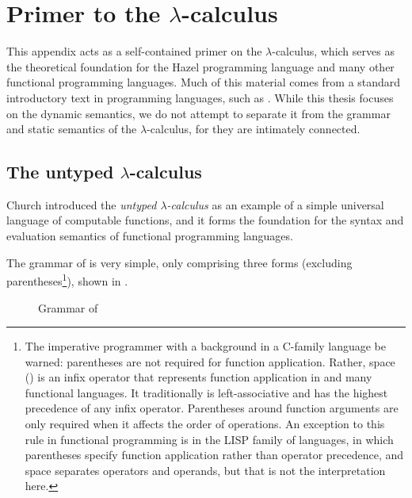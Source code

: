 \chapter{Primer to the $\lambda$-calculus}
\label{sec:lambda-calculus-primer}

This appendix acts as a self-contained primer on the $\lambda$-calculus, which serves as the theoretical foundation for the Hazel programming language and many other functional programming languages. Much of this material comes from a standard introductory text in programming languages, such as \cite{harper2016practical}. While this thesis focuses on the dynamic semantics, we do not attempt to separate it from the grammar and static semantics of the $\lambda$-calculus, for they are intimately connected.

\section{The untyped $\lambda$-calculus}
\label{sec:lambda-calculus}

Church introduced the \textit{untyped $\lambda$-calculus} \ulc{} as an example of a simple universal language of computable functions, and it forms the foundation for the syntax and evaluation semantics of functional programming languages.

The grammar of \ulc{} is very simple, only comprising three forms (excluding parentheses\footnote{The imperative programmer with a background in a C-family language be warned: parentheses are not required for function application. Rather, space (\textvisiblespace) is an infix operator that represents function application in \ulc{} and many functional languages. It traditionally is left-associative and has the highest precedence of any infix operator. Parentheses around function arguments are only required when it affects the order of operations. An exception to this rule in functional programming is in the LISP family of languages, in which parentheses specify function application rather than operator precedence, and space separates operators and operands, but that is not the interpretation here.}), shown in .

\begin{figure}
  \centering
  \begin{mdframed}
    \begin{singlespace}
      
    \end{singlespace}
  \end{mdframed}
  \caption{Grammar of \ulc}
  \label{fig:syntax-ulc}
\end{figure}

